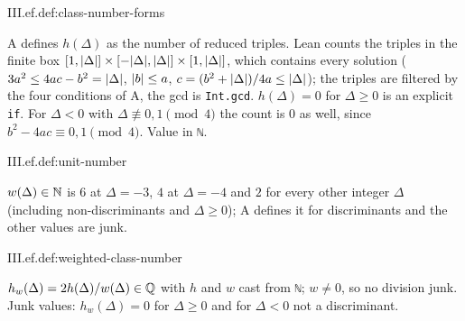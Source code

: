 \begin{definition}
\end{definition}
\begin{tfformal}{III.ef.def:class-number-forms}
\begin{tffidelity}
A defines $h(\Delta)$ as the number of reduced triples. Lean counts the triples in the finite box $[1,\lvert\Delta\rvert]\times[-\lvert\Delta\rvert,\lvert\Delta\rvert]\times[1,\lvert\Delta\rvert]$, which contains every solution ($3a^2\le4ac-b^2=\lvert\Delta\rvert$, $\lvert b\rvert\le a$, $c=(b^2+\lvert\Delta\rvert)/4a\le\lvert\Delta\rvert$); the triples are filtered by the four conditions of A, the gcd is \texttt{Int.gcd}. $h(\Delta)=0$ for $\Delta\ge0$ is an explicit \texttt{if}. For $\Delta<0$ with $\Delta\not\equiv0,1\pmod4$ the count is $0$ as well, since $b^2-4ac\equiv0,1\pmod4$. Value in \texttt{ℕ}.
\end{tffidelity}
\end{tfformal}

\begin{definition}
\end{definition}
\begin{tfformal}{III.ef.def:unit-number}
\begin{tffidelity}
$w(\Delta)\in\mathbb{N}$ is $6$ at $\Delta=-3$, $4$ at $\Delta=-4$ and $2$ for every other integer $\Delta$ (including non-discriminants and $\Delta\ge0$); A defines it for discriminants and the other values are junk.
\end{tffidelity}
\end{tfformal}

\begin{definition}
\end{definition}
\begin{tfformal}{III.ef.def:weighted-class-number}
\begin{tffidelity}
$h_w(\Delta)=2h(\Delta)/w(\Delta)\in\mathbb{Q}$ with $h$ and $w$ cast from \texttt{ℕ}; $w\ne0$, so no division junk. Junk values: $h_w(\Delta)=0$ for $\Delta\ge0$ and for $\Delta<0$ not a discriminant.
\end{tffidelity}
\end{tfformal}

